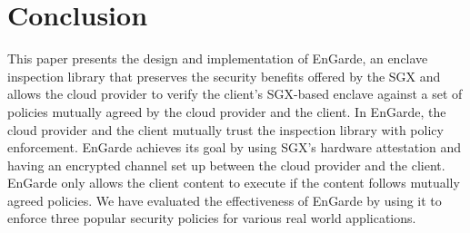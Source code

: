 \section{Conclusion}
\label{section:conclusion}
This paper presents the design and implementation of EnGarde, an enclave inspection library 
that preserves the security benefits offered by the SGX and allows the cloud provider to 
verify the client's SGX-based enclave against a set of policies mutually agreed by the 
cloud provider and the client. In EnGarde, the cloud provider and the client mutually trust 
the inspection library with policy enforcement. EnGarde achieves its goal by using SGX's 
hardware attestation and having an encrypted channel set up between the cloud provider 
and the client. EnGarde only allows the client content to execute if the content follows
mutually agreed policies. We have evaluated the effectiveness of EnGarde by using it to
enforce three popular security policies for various real world applications.


